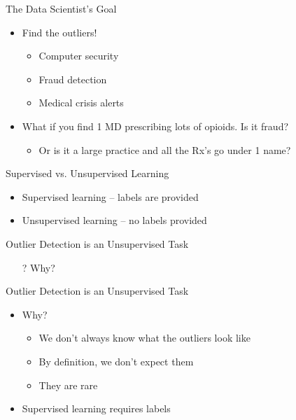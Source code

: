 \documentclass[aspectratio=169]{beamer}
\begin{document}
\begin{frame}{The Data Scientist's Goal}

\begin{itemize}
	\item Find the outliers!
        \begin{itemize}
	\item Computer security
	\item Fraud detection
	\item Medical crisis alerts
        \end{itemize}
\item What if you find 1 MD prescribing lots of opioids. Is it fraud?
        \begin{itemize}
	\item Or is it a large practice and all the Rx's go under 1 name?
        \end{itemize}

\end{itemize}



\end{frame}
\begin{frame}{Supervised vs. Unsupervised Learning}

\begin{itemize}
	\item Supervised learning -- labels are provided
	\item Unsupervised learning -- no labels  provided
\end{itemize}

\end{frame}
\begin{frame}{Outlier Detection is an Unsupervised Task}

\begin{itemize}
	\item[?] Why?
\end{itemize}

\end{frame}
\begin{frame}{Outlier Detection is an Unsupervised Task}

\begin{itemize}
	\item Why?
        \begin{itemize}
        \item We don't always know what the outliers look like
        \item By definition, we don't expect them
        \item They are rare
        \end{itemize}
        \item Supervised learning requires labels
\end{itemize}



\end{frame}
\end{document}
